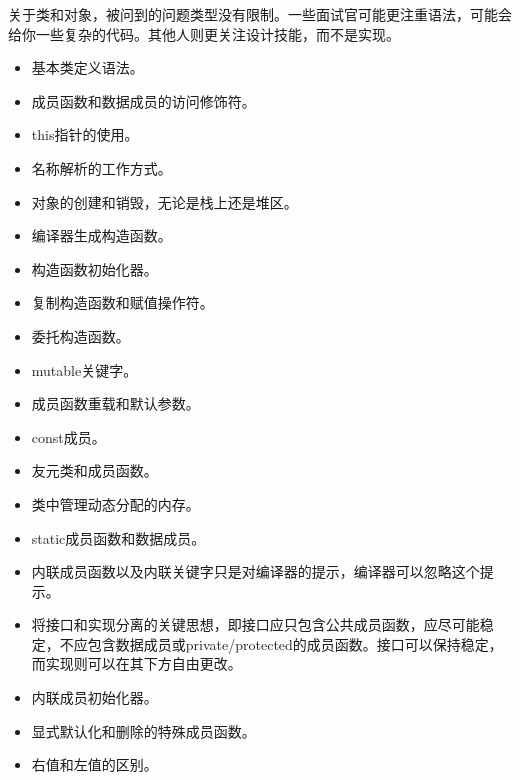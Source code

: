
关于类和对象，被问到的问题类型没有限制。一些面试官可能更注重语法，可能会给你一些复杂的代码。其他人则更关注设计技能，而不是实现。


\begin{itemize}
\item
基本类定义语法。

\item
成员函数和数据成员的访问修饰符。

\item
this指针的使用。

\item
名称解析的工作方式。

\item
对象的创建和销毁，无论是栈上还是堆区。

\item
编译器生成构造函数。

\item
构造函数初始化器。

\item
复制构造函数和赋值操作符。

\item
委托构造函数。

\item
mutable关键字。

\item
成员函数重载和默认参数。

\item
const成员。

\item
友元类和成员函数。

\item
类中管理动态分配的内存。

\item
static成员函数和数据成员。

\item
内联成员函数以及内联关键字只是对编译器的提示，编译器可以忽略这个提示。

\item
将接口和实现分离的关键思想，即接口应只包含公共成员函数，应尽可能稳定，不应包含数据成员或private/protected的成员函数。接口可以保持稳定，而实现则可以在其下方自由更改。

\item
内联成员初始化器。

\item
显式默认化和删除的特殊成员函数。

\item
右值和左值的区别。


\end{itemize}
